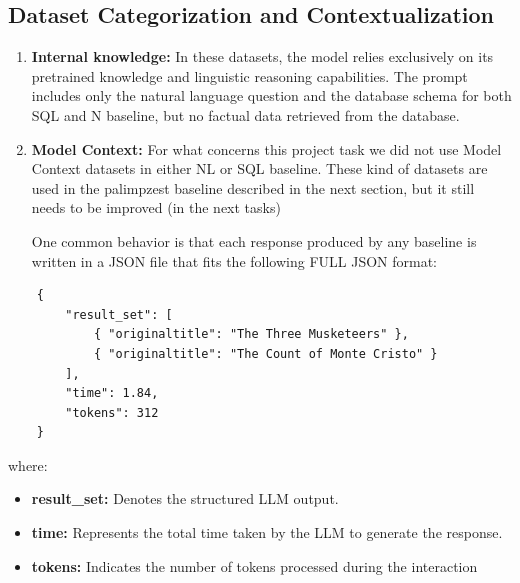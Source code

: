 \documentclass[12pt,a4paper]{article}
\begin{document}
\subsection{Dataset Categorization and Contextualization}
\begin{enumerate}
    \item \textbf{Internal knowledge:} In these datasets, the model relies exclusively on its pretrained knowledge and linguistic reasoning capabilities.
    The prompt includes only the natural language question and the database schema for both SQL and N baseline, but no factual data retrieved from the database.
    \item \textbf{Model Context:} For what concerns this project task we did not use Model Context datasets in either NL or SQL baseline.
    These kind of datasets are used in the palimpzest baseline described in the next section, but it still needs to be improved (in the next tasks)

    One common behavior is that each response produced by any baseline is written in a JSON file that fits the following FULL JSON format:
\end{enumerate}
    \begin{verbatim}
    {
        "result_set": [
            { "originaltitle": "The Three Musketeers" },
            { "originaltitle": "The Count of Monte Cristo" }
        ],
        "time": 1.84,
        "tokens": 312
    }

\end{verbatim}
where:
\begin{itemize}
    \item \textbf{result\_set:} Denotes the structured LLM output.
    \item \textbf{time:} Represents the total time taken by the LLM to generate the response.
    \item \textbf{tokens:} Indicates the number of tokens processed during the interaction
\end{itemize}
\end{document}
